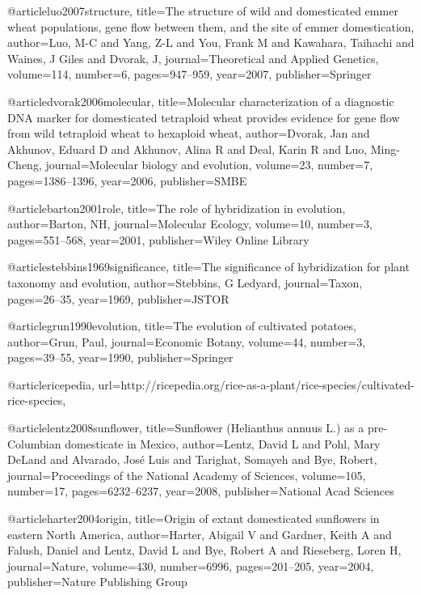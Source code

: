 {@article{luo2007structure,
  title={The structure of wild and domesticated emmer wheat populations, gene flow between them, and the site of emmer domestication},
  author={Luo, M-C and Yang, Z-L and You, Frank M and Kawahara, Taihachi and Waines, J Giles and Dvorak, J},
  journal={Theoretical and Applied Genetics},
  volume={114},
  number={6},
  pages={947--959},
  year={2007},
  publisher={Springer}
}

@article{dvorak2006molecular,
  title={Molecular characterization of a diagnostic DNA marker for domesticated tetraploid wheat provides evidence for gene flow from wild tetraploid wheat to hexaploid wheat},
  author={Dvorak, Jan and Akhunov, Eduard D and Akhunov, Alina R and Deal, Karin R and Luo, Ming-Cheng},
  journal={Molecular biology and evolution},
  volume={23},
  number={7},
  pages={1386--1396},
  year={2006},
  publisher={SMBE}
}

@article{barton2001role,
  title={The role of hybridization in evolution},
  author={Barton, NH},
  journal={Molecular Ecology},
  volume={10},
  number={3},
  pages={551--568},
  year={2001},
  publisher={Wiley Online Library}
}

@article{stebbins1969significance,
  title={The significance of hybridization for plant taxonomy and evolution},
  author={Stebbins, G Ledyard},
  journal={Taxon},
  pages={26--35},
  year={1969},
  publisher={JSTOR}
}

@article{grun1990evolution,
  title={The evolution of cultivated potatoes},
  author={Grun, Paul},
  journal={Economic Botany},
  volume={44},
  number={3},
  pages={39--55},
  year={1990},
  publisher={Springer}
}

@article{ricepedia,
    url={http://ricepedia.org/rice-as-a-plant/rice-species/cultivated-rice-species},
}

@article{lentz2008sunflower,
  title={Sunflower (Helianthus annuus L.) as a pre-Columbian domesticate in Mexico},
  author={Lentz, David L and Pohl, Mary DeLand and Alvarado, Jos{\'e} Luis and Tarighat, Somayeh and Bye, Robert},
  journal={Proceedings of the National Academy of Sciences},
  volume={105},
  number={17},
  pages={6232--6237},
  year={2008},
  publisher={National Acad Sciences}
}

@article{harter2004origin,
  title={Origin of extant domesticated sunflowers in eastern North America},
  author={Harter, Abigail V and Gardner, Keith A and Falush, Daniel and Lentz, David L and Bye, Robert A and Rieseberg, Loren H},
  journal={Nature},
  volume={430},
  number={6996},
  pages={201--205},
  year={2004},
  publisher={Nature Publishing Group}
}

}
